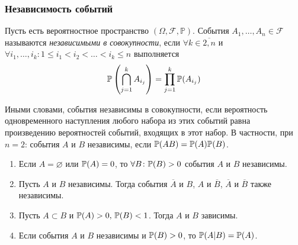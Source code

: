 \subsubsection{Независимость событий}

\begin{defn}
    Пусть есть вероятностное пространство $(\Omega, \mathcal{F}, \mathbb{P})$. События $A_1, \ldots, A_n \in \mathcal{F}$ называются {\it независимыми в совокупности}, если $\forall k \in \overline{2, n}$ и $\forall i_{1}, \ldots, i_{k} \colon 1 \leqslant i_1 < i_2 < \ldots < i_k \leqslant n$ выполняется 
    \begin{equation*}
        \mathbb{P}\left(\bigcap\limits_{j=1}^k A_{i_j}\right) = \prod\limits_{j=1}^k {\mathbb{P}(A_{i_j})}
    \end{equation*}

Иными словами, события независимы в совокупности, если вероятность одновременного наступления любого набора из этих событий равна произведению вероятностей событий, входящих в этот набор. В частности, при $n = 2$: события $A$ и $B$ независимы, если ${\mathbb{P}(AB)} = {\mathbb{P}(A)}{\mathbb{P}(B)}$.
\end{defn}

\begin{namedthm}\leavevmode
    \begin{enumerate}
        \item Если $A = \varnothing$ или ${\mathbb{P}(A)} = 0$, то $\forall B \colon {\mathbb{P}(B)} > 0$ события $A$ и $B$ независимы.
        \item Пусть $A$ и $B$ независимы. Тогда события $\overline{A}$ и $B$, $A$ и $\overline{B}$, $\overline{A}$ и $\overline{B}$ также независимы. 
        \item Пусть $A \subset B$ и ${\mathbb{P}(A)} > 0, \, {\mathbb{P}(B)} < 1$. Тогда $A$ и $B$ зависимы. 
        \item Если события $A$ и $B$ независимы и ${\mathbb{P}(B)} > 0$, то ${\mathbb{P}(A|B)} = {\mathbb{P}(A)}$.
    \end{enumerate}
\end{namedthm}

